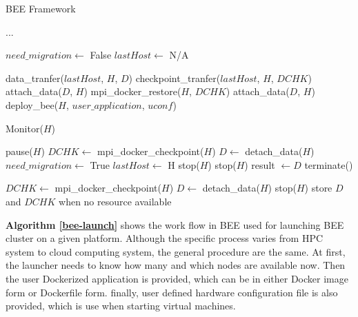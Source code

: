 \begin{algorithm}
\caption{BEE Framework}
\label{bee}
\begin{algorithmic}[1]

{...}


\STATE $need\_migration \leftarrow$ False
\STATE $lastHost \leftarrow$ N/A

		\STATE data\_tranfer($lastHost$, $H$, $D$)
        \STATE checkpoint\_tranfer($lastHost$, $H$, $DCHK$)
		\STATE attach\_data($D$, $H$) 
		\STATE mpi\_docker\_restore($H$, $DCHK$)
	\ELSE
		\STATE attach\_data($D$, $H$)
	\ENDIF
	\STATE deploy\_bee($H$, $user\_application$, $uconf$)

		\STATE Monitor($H$)
	\ENDWHILE

    	\STATE pause($H$)
		\STATE $DCHK \leftarrow$ mpi\_docker\_checkpoint($H$)
		\STATE $D \leftarrow$ detach\_data($H$) 
		\STATE $need\_migration \leftarrow$ True
		\STATE $lastHost \leftarrow$ H
		\STATE stop($H$)
	\ELSE
		\STATE stop($H$)
		\STATE result $\leftarrow D $
		\STATE terminate() 
	\ENDIF
\ENDWHILE

		\STATE $DCHK \leftarrow$ mpi\_docker\_checkpoint($H$)
		\STATE $D\leftarrow$ detach\_data($H$)
		\STATE stop($H$)
		\STATE store $D$ and $DCHK$ when no resource available
\ENDIF

\end{algorithmic}
\end{algorithm}


\textbf{Algorithm \ref{bee-launch}} shows the work flow in BEE used for launching BEE cluster on a given platform. Although the specific process varies from HPC system to cloud computing system, the general procedure are the same. At first, the launcher needs to know how many and which nodes are available now. Then the user Dockerized application is provided, which can be in either Docker image form or Dockerfile form. finally, user defined hardware configuration file is also provided, which is use when starting virtual machines. 

